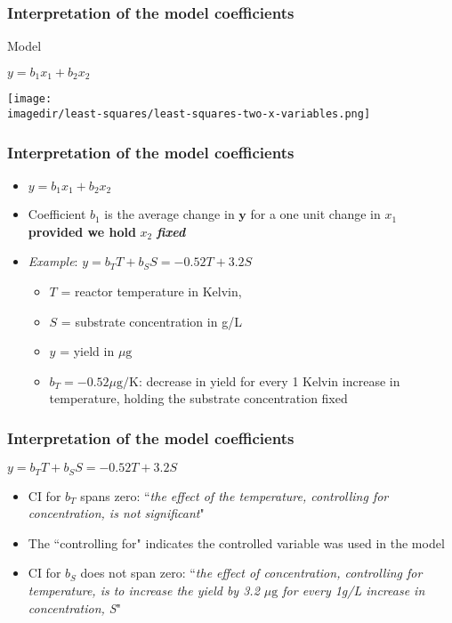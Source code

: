 \begin{frame}\frametitle{Interpretation of the model coefficients}
	\begin{block}
		{Model} 
		\begin{center}
			$y = b_1x_1 + b_2x_2$ 
		\end{center}
	\end{block}
	\begin{center}
		\texttt{[image: \\imagedir/least-squares/least-squares-two-x-variables.png]}
	\end{center}
\end{frame}

\begin{frame}\frametitle{Interpretation of the model coefficients}
	\begin{itemize}
		\item	$y = b_1x_1 + b_2x_2$ 
	\end{itemize}
	\begin{itemize}
		\item	Coefficient $b_1$ is the average change in $\mathbf{y}$ for a one unit change in ${x}_1$ \textbf{provided we hold} ${x}_2$ \textbf{\emph{fixed}} 
	\end{itemize}
	\begin{itemize}
		\item	\emph{Example}: $y = b_T T + b_S S = -0.52 T + 3.2 S$ 
		\begin{itemize}
			\item	$T$ = reactor temperature in Kelvin, 
			\item	$S$ = substrate concentration in g/L 
			\item	$y$ = yield in $\mu\text{g}$ 
			\item	$b_T = -0.52 \mu\text{g}/\text{K}$: decrease in yield for every 1 Kelvin increase in temperature, holding the substrate concentration fixed 
		\end{itemize}
	\end{itemize}
\end{frame}

\begin{frame}\frametitle{Interpretation of the model coefficients}
	
	$y = b_T T + b_S S = -0.52 T + 3.2 S$
	\begin{itemize}
		\item	CI for $b_T$ spans zero: ``\emph{the effect of the temperature, controlling for concentration, is not significant}" 
		\item	The ``controlling for" indicates the controlled variable was used in the model 
		\item	CI for $b_S$ does not span zero: ``\emph{the effect of concentration, controlling for temperature, is to increase the yield by 3.2 $\mu\text{g}$ for every 1g/L increase in concentration, S}" 
	\end{itemize}
\end{frame}

